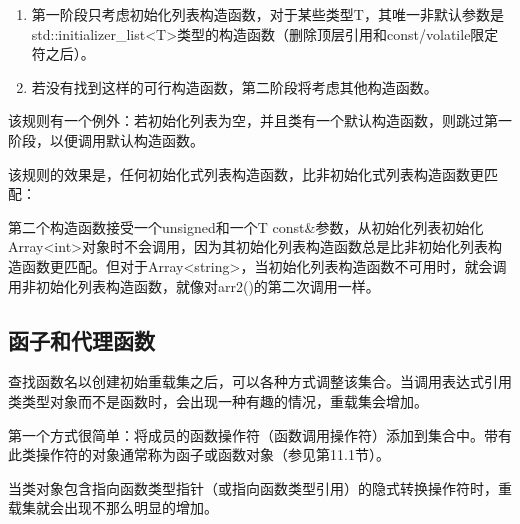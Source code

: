 \begin{enumerate}
\item
第一阶段只考虑初始化列表构造函数，对于某些类型T，其唯一非默认参数是std::initializer\_list<T>类型的构造函数（删除顶层引用和const/volatile限定符之后）。

\item
若没有找到这样的可行构造函数，第二阶段将考虑其他构造函数。
\end{enumerate}

该规则有一个例外：若初始化列表为空，并且类有一个默认构造函数，则跳过第一阶段，以便调用默认构造函数。

该规则的效果是，任何初始化式列表构造函数，比非初始化式列表构造函数更匹配：


第二个构造函数接受一个unsigned和一个T const\&参数，从初始化列表初始化Array<int>对象时不会调用，因为其初始化列表构造函数总是比非初始化列表构造函数更匹配。但对于Array<string>，当初始化列表构造函数不可用时，就会调用非初始化列表构造函数，就像对arr2()的第二次调用一样。

\subsection{函子和代理函数}

查找函数名以创建初始重载集之后，可以各种方式调整该集合。当调用表达式引用类类型对象而不是函数时，会出现一种有趣的情况，重载集会增加。

第一个方式很简单：将成员的函数操作符（函数调用操作符）添加到集合中。带有此类操作符的对象通常称为函子或函数对象（参见第11.1节）。

当类对象包含指向函数类型指针（或指向函数类型引用）的隐式转换操作符时，重载集就会出现不那么明显的增加。

